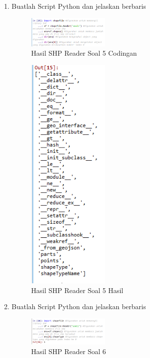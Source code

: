 \begin{enumerate}
    \item Buatlah Script Python dan jelaskan berbaris
    
    \hfill\break
    \begin{figure}[H]
		\includegraphics[width=4cm]{figures/1174096/3/soal5_koding.png}
		\centering
		\caption{Hasil SHP Reader Soal 5 Codingan}
    \end{figure}

    \hfill\break
    \begin{figure}[H]
		\includegraphics[width=4cm]{figures/1174096/3/soal5_out.png}
		\centering
		\caption{Hasil SHP Reader Soal 5 Hasil}
    \end{figure}
    
    \item Buatlah Script Python dan jelaskan berbaris
    
    \hfill\break
    \begin{figure}[H]
		\includegraphics[width=4cm]{figures/1174096/3/soal6.png}
		\centering
		\caption{Hasil SHP Reader Soal 6}
    \end{figure}


\end{enumerate}
